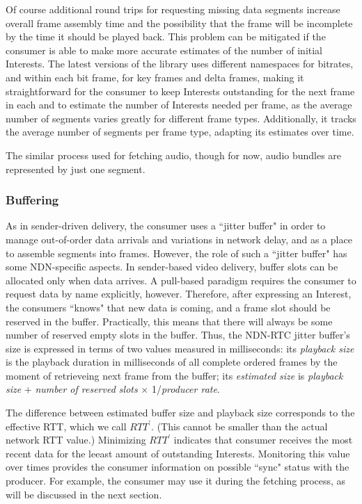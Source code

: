 \documentclass{icn/sig-alternate-2012} %
\newcommand{\ndnrtcName}{NDN-RTC} %
\begin{document}
Of course additional round trips for requesting missing data segments increase overall frame assembly time and the possibility that the frame will be incomplete by the time it should be played back. This problem can be mitigated if the consumer is able to make more accurate estimates of the number of initial Interests. The latest versions of the library uses different namespaces for bitrates, and within each bit frame, for key frames and delta frames, making it straightforward for the consumer to keep Interests outstanding for the next frame in each and to estimate the number of Interests needed per frame, as the average number of segments varies greatly for different frame types. 
Additionally, it tracks the average number of segments per frame type, adapting its estimates over time. 

The similar process used for fetching audio, though for now, audio bundles are represented by just one segment.

\subsubsection{Buffering}


As in sender-driven delivery, the consumer uses a ``jitter buffer" in order to manage out-of-order data arrivals and variations in network delay, and as a place to assemble segments into frames. However, the role of such a ``jitter buffer"  has some NDN-specific aspects. In sender-based video delivery, buffer slots can be allocated only when data arrives. A pull-based paradigm requires the consumer to request data by name explicitly, however. Therefore, after expressing an Interest, the consumers ``knows" that new data is coming, and a frame slot should be reserved in the buffer. Practically, this means that there will always be some number of reserved empty slots in the buffer. Thus, the \ndnrtcName{} jitter buffer's size is expressed in terms of two values measured in milliseconds: its  \textit{playback size} is the playback duration in milliseconds of all complete ordered frames by the moment of retrieveing next frame from the buffer; its \textit{estimated size} is \textit{playback size} + \textit{number of reserved slots} $\times$ 1/\textit{producer rate}.

The difference between estimated buffer size and playback size corresponds to the effective RTT, which we call $RTT^{\prime}$.  (This cannot be smaller than the actual network RTT value.) Minimizing $RTT^{\prime}$ indicates that consumer receives the most recent data for the leeast amount of outstanding Interests. %
Monitoring this value over times provides the consumer information on possible ``sync" status with the producer. %
For example, the consumer may use it during the fetching process, as will be discussed in the next section. 
\end{document}
